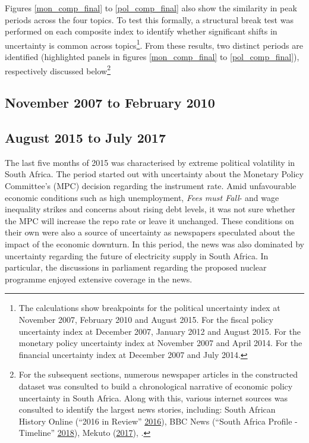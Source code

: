 \documentclass[11pt,preprint, authoryear]{elsarticle}
\numberwithin{equation}{section}
\numberwithin{figure}{section}
\numberwithin{table}{section}
\let\rmarkdownfootnote\footnote%
\def\footnote{\protect\rmarkdownfootnote}
\begin{document}
Figures \ref{mon_comp_final} to \ref{pol_comp_final} also show the
similarity in peak periods across the four topics. To test this
formally, a structural break test was performed on each composite index
to identify whether significant shifts in uncertainty is common across
topics\footnote{The calculations show breakpoints for the political
  uncertainty index at November 2007, February 2010 and August 2015. For
  the fiscal policy uncertainty index at December 2007, January 2012 and
  August 2015. For the monetary policy uncertainty index at November
  2007 and April 2014. For the financial uncertainty index at December
  2007 and July 2014.}. From these results, two distinct periods are
identified (highlighted panels in figures \ref{mon_comp_final} to
\ref{pol_comp_final}), respectively discussed below\footnote{For the
  subsequent sections, numerous newspaper articles in the constructed
  dataset was consulted to build a chronological narrative of economic
  policy uncertainty in South Africa. Along with this, various internet
  sources was consulted to identify the largest news stories, including:
  South African History Online (``2016 in Review''
  \protect\hyperlink{ref-2016}{2016}), BBC News (``South Africa Profile
  - Timeline'' \protect\hyperlink{ref-2018}{2018}), Mekuto
  (\protect\hyperlink{ref-Mekuto2017}{2017}), .}

\subsection{November 2007 to February
2010}\label{november-2007-to-february-2010}

\subsection{August 2015 to July 2017}\label{august-2015-to-july-2017}

The last five months of 2015 was characterised by extreme political
volatility in South Africa. The period started out with uncertainty
about the Monetary Policy Committee's (MPC) decision regarding the
instrument rate. Amid unfavourable economic conditions such as high
unemployment, \emph{Fees must Fall}- and wage inequality strikes and
concerns about rising debt levels, it was not sure whether the MPC will
increase the repo rate or leave it unchanged. These conditions on their
own were also a source of uncertainty as newspapers speculated about the
impact of the economic downturn. In this period, the news was also
dominated by uncertainty regarding the future of electricity supply in
South Africa. In particular, the discussions in parliament regarding the
proposed nuclear programme enjoyed extensive coverage in the news.
\end{document}
